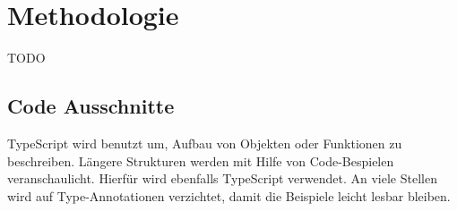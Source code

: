 \chapter{Methodologie}

TODO 

\section{Code Ausschnitte}

TypeScript wird benutzt um, Aufbau von Objekten oder Funktionen zu beschreiben. Längere Strukturen werden mit Hilfe von Code-Bespielen veranschaulicht. Hierfür wird ebenfalls TypeScript verwendet. An viele Stellen wird auf Type-Annotationen verzichtet, damit die Beispiele leicht lesbar bleiben.